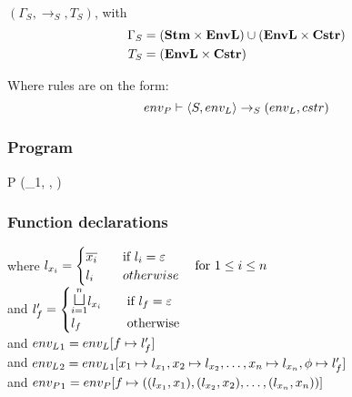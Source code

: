 \paragraph{}\noindent
$(\Gamma_S, \rightarrow_S, T_S)$, with
\begin{align*}
  \Gamma_S & = (\mathbf{Stm} \times \mathbf{EnvL}) \cup (\mathbf{EnvL} \times \mathbf{Cstr}) \\
  T_S & = (\mathbf{EnvL} \times \mathbf{Cstr})
\end{align*}

\noindent
Where rules are on the form:
\[ {env_P} \vdash \langle S, {env_L} \rangle \rightarrow_{S} ({env_L}, {cstr}) \]



\subsubsection{Program}

        {}
        { \quad
          }
        {}
\begin{trules}
        { {P} {(\ienvL_1, \icstr, \ienvP)} }
        {\ienvP \vdash {}}
        {}
\end{trules}

\subsubsection{Function declarations}

        {}
        {}
        {where $l_{x_i} = \begin{cases}
          \overline{x_i} & \quad \text{if } l_i = \varepsilon \\
          l_i & \quad otherwise
        \end{cases}\quad \text{for } 1 \leq i \leq n$ \\
          and $l_f' = \begin{cases}
            \mathlarger\sqcupl_{i = 1}^n l_{x_i} & \quad \text{if } l_f = \varepsilon \\
            l_f & \quad \text{otherwise}
        \end{cases}$ \\
          and ${env_L}_1 = {env_L}[f \mapsto l_f']$ \\
          and ${env_L}_2 = {env_L}_1[x_1 \mapsto l_{x_1}, x_2 \mapsto l_{x_2}, \dots, x_n \mapsto l_{x_n}, \phi \mapsto l_f']$ \\
          and ${env_P}_1 = {env_P}[f \mapsto ((l_{x_1}, x_1), (l_{x_2}, x_2), \dots, (l_{x_n}, x_n))]$}

